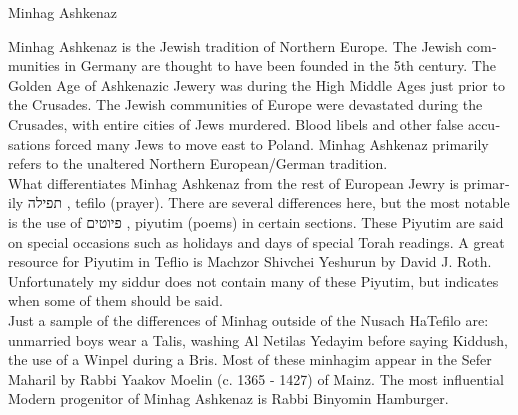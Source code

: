 \documentclass[twoside, openany, parskip=half, 11pt]{book}
\begin{document}
\begin{minipage}{\textwidth}
\begin{english}
\begin{center}
\begin{Large}
Minhag Ashkenaz
\end{Large}
\end{center}

Minhag Ashkenaz is the Jewish tradition of Northern Europe. The Jewish communities in Germany are thought to have been founded in the 5th century. The Golden Age of Ashkenazic Jewery was during the High Middle Ages just prior to the Crusades. The Jewish communities of Europe were devastated during the Crusades, with entire cities of Jews murdered. Blood libels and other false accusations forced many Jews to move east to Poland. Minhag Ashkenaz primarily refers to the unaltered Northern European/German tradition.\\

What differentiates Minhag Ashkenaz from the rest of European Jewry is primarily תפילה , tefilo (prayer). There are several differences here, but the most notable is the use of פיוטים , piyutim (poems) in certain sections. These Piyutim are said on special occasions such as holidays and days of special Torah readings. A great resource for Piyutim in Teflio is Machzor Shivchei Yeshurun by David J. Roth. Unfortunately my siddur does not contain many of these Piyutim, but indicates when some of them should be said.\\

Just a sample of the differences of Minhag outside of the Nusach HaTefilo are: unmarried boys wear a Talis, washing Al Netilas Yedayim before saying Kiddush, the use of a Winpel during a Bris. Most of these minhagim appear in the Sefer Maharil by Rabbi Yaakov Moelin (c. 1365 - 1427) of Mainz. The most influential Modern progenitor of Minhag Ashkenaz is Rabbi Binyomin Hamburger. 

\end{english}
\end{minipage}

\clearpage
\end{document}

